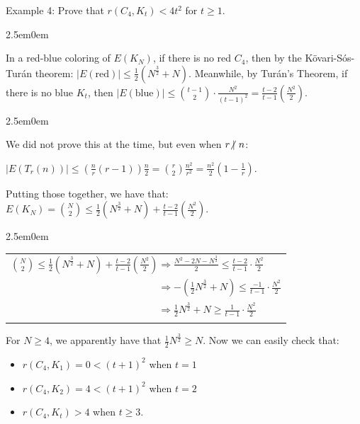 \documentclass{book}
\newcommand{\exTwo}{%
   \color{RedViolet}%
   \fontsize{13}{15}\selectfont%
}
\newcommand{\exP}{%
   \color{VioletRed}%
   \fontsize{12}{14}\selectfont%
}
\newenvironment{myIndent}{%
   \begin{adjustwidth}{2.5em}{0em}%
}{%
   \end{adjustwidth}%
}
\newcommand{\ndiv}{\hspace{-0.3em}\not|\hspace{0.35em}}
\newcommand{\retTwo}{\hfill\bigbreak}
\begin{document}
Example 4: Prove that $r(C_4, K_t) < 4t^2$ for $t \geq 1$.
{\begin{myIndent} \exTwo
   In a red-blue coloring of $E(K_N)$, if there is no red $C_4$, then by the Kövari-Sós-\\Turán theorem: $|E(\mathrm{red})| \leq \frac{1}{2}(N^\frac{3}{2} + N)$. Meanwhile, by Turán's Theorem, if there is no blue $K_t$, then $|E(\mathrm{blue})| \leq \binom{t-1}{2}\cdot\frac{N^2}{(t-1)^2} = \frac{t-2}{t-1}\left(\frac{N^2}{2}\right)$.\retTwo
   
   {\begin{myIndent} \exP
      We did not prove this at the time, but even when $r \ndiv n$:

      {\centering$ |E(T_r(n))| \leq \left(\frac{n}{r}(r - 1)\right)\frac{n}{2} = \binom{r}{2}\frac{n^2}{r^2} = \frac{n^2}{2}(1 - \frac{1}{r})$.\retTwo\par}
   \end{myIndent}}

   Putting those together, we have that: $E(K_N) = \binom{N}{2} \leq \frac{1}{2}(N^{\frac{3}{2}} + N) + \frac{t-2}{t-1}\left(\frac{N^2}{2}\right)$.\\
   \begin{myIndent}
      \begin{tabular}{l}
         $ \binom{N}{2} \leq \frac{1}{2}(N^{\frac{3}{2}} + N) + \frac{t-2}{t-1}\left(\frac{N^2}{2}\right) \Longrightarrow \frac{N^2 - 2N - N^\frac{3}{2}}{2} \leq \frac{t-2}{t-1}\cdot\frac{N^2}{2}$\\
         $ \phantom{\binom{N}{2} \leq \frac{1}{2}(N^{\frac{3}{2}} + N) + \frac{t-2}{t-1}\left(\frac{N^2}{2}\right)} \Longrightarrow -(\frac{1}{2}N^\frac{3}{2} + N) \leq \frac{-1}{t-1}\cdot\frac{N^2}{2}$ \\
         $ \phantom{\binom{N}{2} \leq \frac{1}{2}(N^{\frac{3}{2}} + N) + \frac{t-2}{t-1}\left(\frac{N^2}{2}\right)} \Longrightarrow \frac{1}{2}N^\frac{3}{2} + N \geq \frac{1}{t-1}\cdot \frac{N^2}{2}$
      \end{tabular}\retTwo
   \end{myIndent}

   For $N \geq 4$, we apparently have that $\frac{1}{2}N^\frac{3}{2} \geq N$. Now we can easily check that:
   \begin{itemize}
      \item $r(C_4, K_1) = 0 < (t+1)^2$ when $t = 1$
      \item $r(C_4, K_2) = 4 < (t+1)^2$ when $t = 2$
      \item $r(C_4, K_t) > 4$ when $t \geq 3$.
   \end{itemize}


\end{myIndent}}
\end{document}
